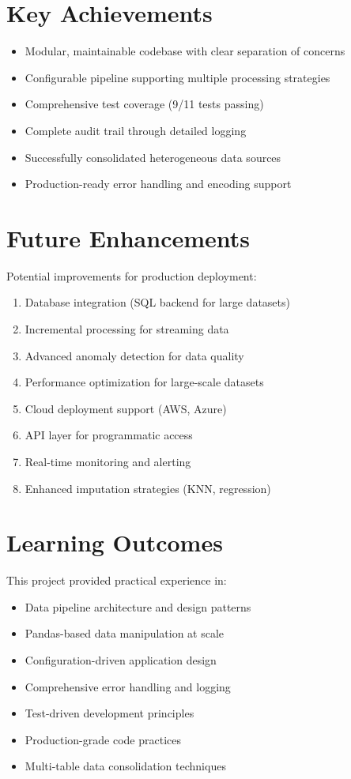 \documentclass[12pt,a4paper]{report}
\begin{document}
\section{Key Achievements}

\begin{itemize}
    \item Modular, maintainable codebase with clear separation of concerns
    \item Configurable pipeline supporting multiple processing strategies
    \item Comprehensive test coverage (9/11 tests passing)
    \item Complete audit trail through detailed logging
    \item Successfully consolidated heterogeneous data sources
    \item Production-ready error handling and encoding support
\end{itemize}

\section{Future Enhancements}

Potential improvements for production deployment:

\begin{enumerate}
    \item Database integration (SQL backend for large datasets)
    \item Incremental processing for streaming data
    \item Advanced anomaly detection for data quality
    \item Performance optimization for large-scale datasets
    \item Cloud deployment support (AWS, Azure)
    \item API layer for programmatic access
    \item Real-time monitoring and alerting
    \item Enhanced imputation strategies (KNN, regression)
\end{enumerate}

\section{Learning Outcomes}

This project provided practical experience in:
\begin{itemize}
    \item Data pipeline architecture and design patterns
    \item Pandas-based data manipulation at scale
    \item Configuration-driven application design
    \item Comprehensive error handling and logging
    \item Test-driven development principles
    \item Production-grade code practices
    \item Multi-table data consolidation techniques
\end{itemize}
\end{document}
